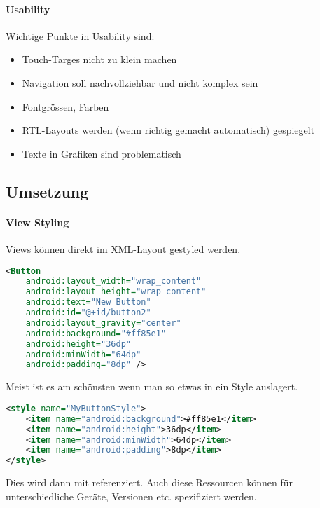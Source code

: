\paragraph{Usability} Wichtige Punkte in Usability sind:
\begin{itemize}
\item Touch-Targes nicht zu klein machen
\item Navigation soll nachvollziehbar und nicht komplex sein
\item Fontgrössen, Farben
\item RTL-Layouts werden (wenn richtig gemacht automatisch) gespiegelt
\item Texte in Grafiken sind problematisch
\end{itemize}
\subsection{Umsetzung}
\paragraph{View Styling} Views können direkt im XML-Layout gestyled werden. 
\begin{lstlisting}[language=xml]
<Button
    android:layout_width="wrap_content"
    android:layout_height="wrap_content"
    android:text="New Button"
    android:id="@+id/button2"
    android:layout_gravity="center"
    android:background="#ff85e1"
    android:height="36dp"
    android:minWidth="64dp"
    android:padding="8dp" />
\end{lstlisting}
Meist ist es am schönsten wenn man so etwas in ein Style auslagert.
\begin{lstlisting}[language=xml]
<style name="MyButtonStyle">
    <item name="android:background">#ff85e1</item>
    <item name="android:height">36dp</item>
    <item name="android:minWidth">64dp</item>
    <item name="android:padding">8dp</item>
</style>
\end{lstlisting}
Dies wird dann mit  referenziert. Auch diese Ressourcen können für unterschiedliche Geräte, Versionen etc. spezifiziert werden. 
